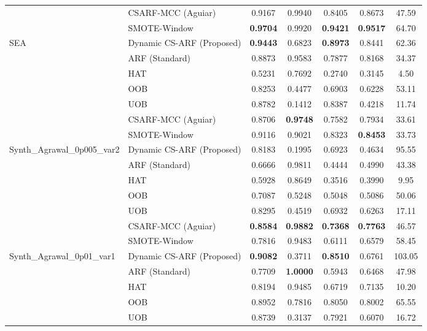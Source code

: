 \begin{longtable}{|l|l|c|c|c|c|c|}
 & CSARF-MCC (Aguiar) & 0.9167 & 0.9940 & 0.8405 & 0.8673 & 47.59 \\ \cline{2-7}
 & SMOTE-Window & \textbf{0.9704} & 0.9920 & \textbf{0.9421} & \textbf{0.9517} & 64.70 \\ \hline
\multirow{7}{*}{SEA} & Dynamic CS-ARF (Proposed) & \textbf{0.9443} & 0.6823 & \textbf{0.8973} & 0.8441 & 62.36 \\ \cline{2-7}
 & ARF (Standard) & 0.8873 & 0.9583 & 0.7877 & 0.8168 & 34.37 \\ \cline{2-7}
 & HAT & 0.5231 & 0.7692 & 0.2740 & 0.3145 & 4.50 \\ \cline{2-7}
 & OOB & 0.8253 & 0.4477 & 0.6903 & 0.6228 & 53.11 \\ \cline{2-7}
 & UOB & 0.8782 & 0.1412 & 0.8387 & 0.4218 & 11.74 \\ \cline{2-7}
 & CSARF-MCC (Aguiar) & 0.8706 & \textbf{0.9748} & 0.7582 & 0.7934 & 33.61 \\ \cline{2-7}
 & SMOTE-Window & 0.9116 & 0.9021 & 0.8323 & \textbf{0.8453} & 33.73 \\ \hline
\multirow{7}{*}{Synth_Agrawal_0p005_var2} & Dynamic CS-ARF (Proposed) & 0.8183 & 0.1995 & 0.6923 & 0.4634 & 95.55 \\ \cline{2-7}
 & ARF (Standard) & 0.6666 & 0.9811 & 0.4444 & 0.4990 & 43.38 \\ \cline{2-7}
 & HAT & 0.5928 & 0.8649 & 0.3516 & 0.3990 & 9.95 \\ \cline{2-7}
 & OOB & 0.7087 & 0.5248 & 0.5048 & 0.5086 & 50.06 \\ \cline{2-7}
 & UOB & 0.8295 & 0.4519 & 0.6932 & 0.6263 & 17.11 \\ \cline{2-7}
 & CSARF-MCC (Aguiar) & \textbf{0.8584} & \textbf{0.9882} & \textbf{0.7368} & \textbf{0.7763} & 46.57 \\ \cline{2-7}
 & SMOTE-Window & 0.7816 & 0.9483 & 0.6111 & 0.6579 & 58.45 \\ \hline
\multirow{7}{*}{Synth_Agrawal_0p01_var1} & Dynamic CS-ARF (Proposed) & \textbf{0.9082} & 0.3711 & \textbf{0.8510} & 0.6761 & 103.05 \\ \cline{2-7}
 & ARF (Standard) & 0.7709 & \textbf{1.0000} & 0.5943 & 0.6468 & 47.98 \\ \cline{2-7}
 & HAT & 0.8194 & 0.9485 & 0.6719 & 0.7135 & 10.20 \\ \cline{2-7}
 & OOB & 0.8952 & 0.7816 & 0.8050 & 0.8002 & 65.55 \\ \cline{2-7}
 & UOB & 0.8739 & 0.3137 & 0.7921 & 0.6070 & 16.72 \\ \cline{2-7}

\end{longtable}
